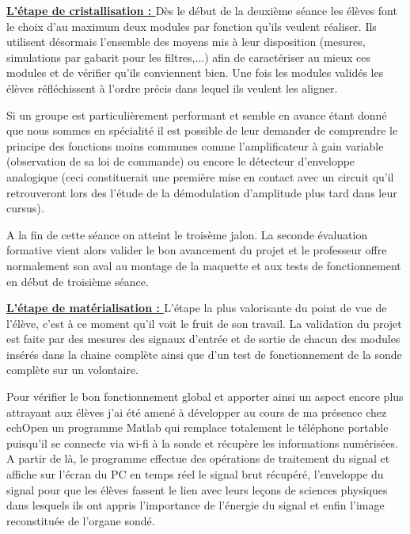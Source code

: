 \documentclass[12pt]{article}
\begin{document}
\textbf{\underline{L'étape de cristallisation : }} Dès le début de la deuxième séance les élèves font le choix d'au maximum deux modules par fonction qu'ils veulent réaliser. Ils utilisent désormais l'ensemble des moyens mis à leur disposition (mesures, simulations par gabarit pour les filtres,...) afin de caractériser au mieux ces modules  et de vérifier qu'ils conviennent bien. Une fois les modules validés les élèves réfléchissent à l'ordre précis dans lequel ils veulent les aligner. \par
Si un groupe est particulièrement performant et semble en avance étant donné que nous sommes en spécialité il est possible de leur demander de comprendre le principe des fonctions moins communes comme l'amplificateur à gain variable (observation de sa loi de commande) ou encore le détecteur d'enveloppe analogique (ceci constituerait une première mise en contact avec un circuit qu'il retrouveront lors des l'étude de la démodulation d'amplitude plus tard dans leur cursus).\par
A la fin de cette séance on atteint le troisème jalon. La seconde évaluation formative vient alors valider le bon avancement du projet et le professeur offre normalement son aval au montage de la maquette et aux tests de fonctionnement en début de troisième séance.\par
\vspace{20pt}


\textbf{\underline{L'étape de matérialisation : }} L'étape la plus valorisante du point de vue de l'élève, c'est à ce moment qu'il voit le fruit de son travail. La validation du projet est faite par des mesures des signaux d'entrée et de sortie de chacun des modules insérés dans la chaine complète ainsi que d'un test de fonctionnement de la sonde complète sur un volontaire. \par
\vspace{10pt}

Pour vérifier le bon fonctionnement global et apporter ainsi un aspect encore plus attrayant aux élèves j'ai été amené à développer au cours de ma présence chez echOpen un programme Matlab qui remplace totalement le téléphone portable puisqu'il se connecte via wi-fi à la sonde et récupère les informations numérisées. A partir de là, le programme effectue des opérations de traitement du signal et affiche sur l'écran du PC en temps réel le signal brut récupéré, l'enveloppe du signal pour que les élèves fassent le lien avec leurs leçons de sciences physiques dans lesquels ils ont appris l'importance de l'énergie du signal et enfin l'image reconstituée de l'organe sondé. 
\end{document}
